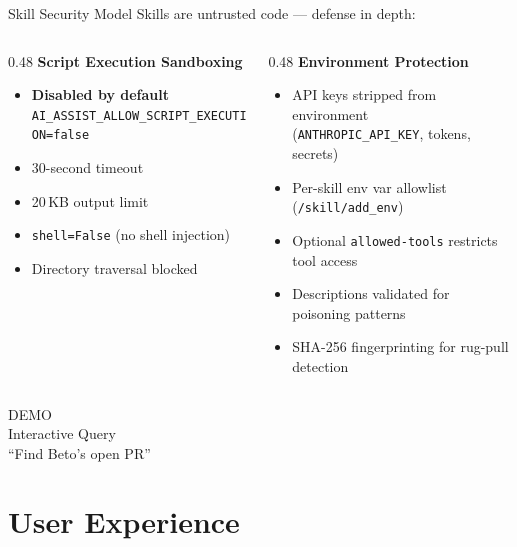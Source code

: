 \documentclass[aspectratio=169,10pt]{beamer}
\begin{document}
\begin{frame}{Skill Security Model}
Skills are \alert{untrusted code} --- defense in depth:

\medskip
\begin{columns}[T]
\begin{column}{0.48\textwidth}
\textbf{Script Execution Sandboxing}
\begin{itemize}\scriptsize
  \item \textbf{Disabled by default}\\
    \texttt{AI\_ASSIST\_ALLOW\_SCRIPT\_EXECUTION=false}
  \item 30-second timeout
  \item 20\,KB output limit
  \item \texttt{shell=False} (no shell injection)
  \item Directory traversal blocked
\end{itemize}
\end{column}
\begin{column}{0.48\textwidth}
\textbf{Environment Protection}
\begin{itemize}\scriptsize
  \item API keys stripped from environment\\
    (\texttt{ANTHROPIC\_API\_KEY}, tokens, secrets)
  \item Per-skill env var allowlist (\texttt{/skill/add\_env})
  \item Optional \texttt{allowed-tools} restricts tool access
  \item Descriptions validated for poisoning patterns
  \item SHA-256 fingerprinting for rug-pull detection
\end{itemize}
\end{column}
\end{columns}
\end{frame}

\begin{frame}[standout]
  \Huge DEMO\\[0.5cm]
  \large Interactive Query\\[0.3cm]
  \normalsize ``Find Beto's open PR''
\end{frame}

\section{User Experience}
\end{document}
